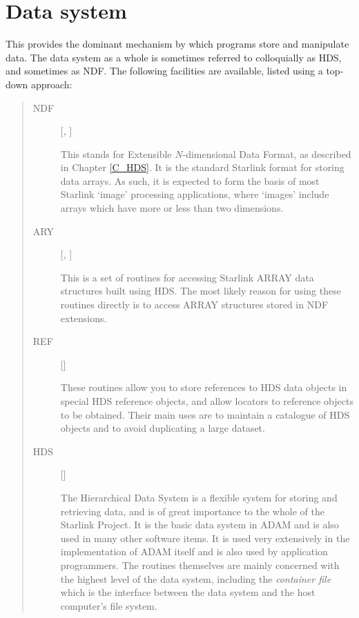 \section{Data system}

This provides the dominant mechanism by which programs store and manipulate
data.
The data system as a whole is sometimes referred to colloquially as HDS, and
sometimes as NDF.
The following facilities are available, listed using a top-down approach:
\begin{quote}
\begin{description}

\item [NDF] \hfill [, ]

 This stands for Extensible $N$-dimensional Data Format, as described
 in Chapter \ref{C_HDS}.
 It is the standard Starlink format for storing data arrays.
 As such, it is expected to form the basis of most Starlink `image' processing
 applications, where `images' include arrays which have more or less than two
 dimensions.

\item [ARY] \hfill [, ]

 This is a set of routines for accessing Starlink ARRAY data structures built
 using HDS.
 The most likely reason for using these routines directly is to access
 ARRAY structures stored in NDF extensions.

\item [REF] \hfill []

 These routines allow you to store references to HDS data objects in special
 HDS reference objects, and allow locators to reference objects to be obtained.
 Their main uses are to maintain a catalogue of HDS objects and to avoid
 duplicating a large dataset.

\item [HDS] \hfill []

 The Hierarchical Data System is a flexible system for storing and retrieving
 data, and is of great importance to the whole of the Starlink Project.
 It is the basic data system in ADAM and is also used in many other software
 items.
 It is used very extensively in the implementation of ADAM itself and is also
 used  by application programmers.
 The routines themselves are mainly concerned with the highest level of the
 data system, including the {\em container file} which is the interface
 between the data system and the host computer's file system.


\end{description}
\end{quote}
